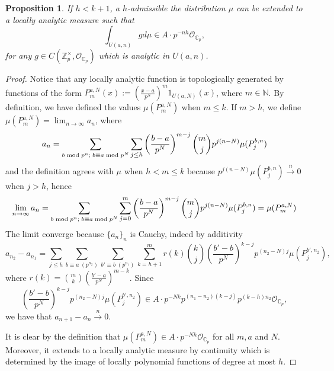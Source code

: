\documentclass{amsart}
\newtheorem{prop0}[defn0]{Proposition}
\newenvironment{proposition}{\begin{prop0}}{\end{prop0}}
\newcommand{\Z}{{\mathbb Z}}
\newcommand{\C}{{\mathbb C}}
\newcommand{\N}{{\mathbb N}}
\newcommand{\cO}{{\mathcal O}}
\begin{document}
\begin{proposition}\label{propext}
If $h<k+1$, a $h$-admissible the distribution $\mu$ can be extended to a locally analytic measure such that
\[
\int_{U(a,n)}g d\mu\in A\cdot p^{-n h}\cO_{\C_p}, 
\]
for any $g\in C(\Z_p^\times,\cO_{\C_p})$ which is analytic in $U(a,n)$.
\end{proposition}
\begin{proof}
Notice that any locally analytic function is topologically generated by functions of the form $P_m^{a,N}(x):=\left(\frac{x-a}{p^N}\right)^m1_{U(a,N)}(x)$, where $m\in\N$. By definition,  we have defined the values $\mu(P^{a,N}_m)$ when $m\leq k$. If $m>h$, we define $\mu(P_m^{a,N})=\lim_{n\rightarrow\infty}a_n$, where
\[
a_n=\sum_{b\;{\rm mod}\; p^{n};\;b\equiv a\;{\rm mod}\; p^N}\sum_{j\leq h}\left(\frac{b-a}{p^N}\right)^{m-j}\binom{m}{j}p^{j(n-N)}\mu(P_j^{b,n})%
\]
and the definition agrees with $\mu$ when $h<m\leq k$ because $p^{j(n-N)}\mu(P_j^{b,n})\stackrel{n}{\rightarrow}0$ when $j>h$, hence
\[
\lim_{n\rightarrow\infty}a_n=\sum_{b\;{\rm mod}\; p^{n};\;b\equiv a\;{\rm mod}\; p^N}\sum_{j=0}^m\left(\frac{b-a}{p^N}\right)^{m-j}\binom{m}{j}p^{j(n-N)}\mu(P_j^{b,n})=\mu(P_m^{a,N})
\]
The limit converge because $\{a_n\}_n$ is Cauchy, indeed by additivity
\[
a_{n_2}-a_{n_1}=\sum_{j\leq h}\sum_{b\equiv a\;(p^{n_2})}\sum_{b'\equiv b\;(p^{n_1})}\sum_{k=h+1}^{m}r(k)\binom{k}{j}\left(\frac{b'-b}{p^N}\right)^{k-j}p^{(n_2-N)j}\mu(P_{j}^{b',n_2}),
\]
where $r(k)=\binom{m}{k}\left(\frac{b'-a}{p^N}\right)^{m-k}$.
Since 
\[
\left(\frac{b'-b}{p^N}\right)^{k-j}p^{(n_2-N)j}\mu(P_{j}^{b',n_2})\in A\cdot p^{-Nk}p^{(n_1-n_2)(k-j)}p^{(k-h)n_2}\cO_{\C_p},
\]
we have that $a_{n+1}-a_{n}\stackrel{n}{\rightarrow} 0$. 

It is clear by the definition that $\mu(P_m^{a,N})\in A\cdot p^{-N h}\cO_{\C_p}$ for all $m, a$ and $N$. Moreover, it extends to a locally analytic measure by continuity which is determined by the image of locally polynomial functions of degree at most $h$.
\end{proof}
\end{document}
